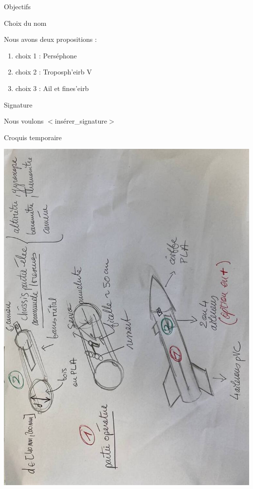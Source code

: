 \documentclass{beamer}
\begin{document}
	\begin{frame}{Objectifs}

		\begin{block}{Choix du nom}

			Nous avons deux propositions :
			\begin{enumerate}
				
				\item choix 1 : Perséphone
				\item choix 2 : Troposph'eirb V
				\item choix 3 : Ail et fines'eirb
			\end{enumerate}
		\end{block}
		
		


		\begin{block}{Signature}

			Nous voulons $<$insérer\_signature$>$
		\end{block}
		
	\end{frame}


	\begin{frame}{Croquis temporaire}
		
		\begin{center}

			\includegraphics[width=0.6\linewidth,angle=270]{pics/5855222429968874941_121.jpg}
		 \end{center}
	\end{frame}
	
\end{document}
